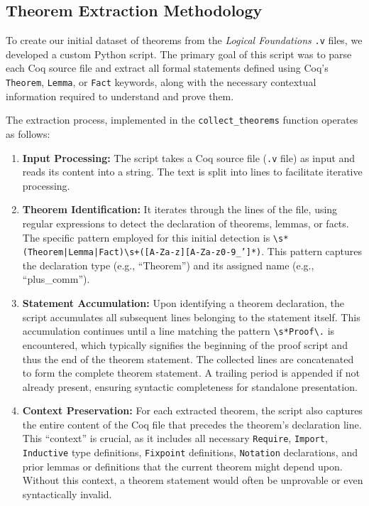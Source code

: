 \subsection{Theorem Extraction Methodology}
\label{sec:theorem_extraction}

To create our initial dataset of theorems from the \emph{Logical Foundations} \texttt{.v} files, we developed a custom Python script. The primary goal of this script was to parse each Coq source file and extract all formal statements defined using Coq's \texttt{Theorem}, \texttt{Lemma}, or \texttt{Fact} keywords, along with the necessary contextual information required to understand and prove them.

The extraction process, implemented in the \texttt{collect\_theorems} function operates as follows:
\begin{enumerate}
    \item \textbf{Input Processing:} The script takes a Coq source file (\texttt{.v} file) as input and reads its content into a string. The text is split into lines to facilitate iterative processing.
    \item \textbf{Theorem Identification:} It iterates through the lines of the file, using regular expressions to detect the declaration of theorems, lemmas, or facts. The specific pattern employed for this initial detection is \texttt{\textbackslash s*(Theorem|Lemma|Fact)\textbackslash s+([A-Za-z][A-Za-z0-9\_']*)}. This pattern captures the declaration type (e.g., ``Theorem'') and its assigned name (e.g., ``plus\_comm'').
    \item \textbf{Statement Accumulation:} Upon identifying a theorem declaration, the script accumulates all subsequent lines belonging to the statement itself. This accumulation continues until a line matching the pattern \texttt{\textbackslash s*Proof\textbackslash .} is encountered, which typically signifies the beginning of the proof script and thus the end of the theorem statement. The collected lines are concatenated to form the complete theorem statement. A trailing period is appended if not already present, ensuring syntactic completeness for standalone presentation.
    \item \textbf{Context Preservation:} For each extracted theorem, the script also captures the entire content of the Coq file that precedes the theorem's declaration line. This ``context'' is crucial, as it includes all necessary \texttt{Require}, \texttt{Import}, \texttt{Inductive} type definitions, \texttt{Fixpoint} definitions, \texttt{Notation} declarations, and prior lemmas or definitions that the current theorem might depend upon. Without this context, a theorem statement would often be unprovable or even syntactically invalid.

\end{enumerate}
